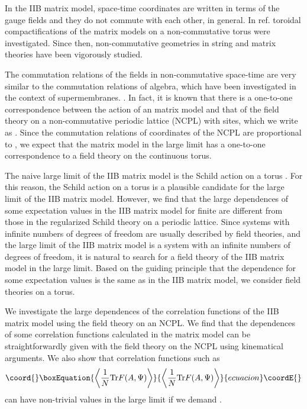 \documentclass[12pt,a4paper]{article}
\providecommand{\ncpl}{{\mathbb T}^2_\frac{2}{N}}
\providecommand{\Tr}{\mbox{\rm Tr}}
\begin{document}
In the IIB matrix model, space-time coordinates are written in terms
of the gauge fields and they do not commute with each other, in
general.
In ref.\cite{CDS} toroidal compactifications of the matrix models on
a non-commutative torus were investigated. Since then,
non-commutative geometries in string and matrix theories have been
vigorously studied.

The commutation relations of the fields in non-commutative space-time
are very similar to the commutation relations of \coordHE{} algebra, which
have been investigated in the context of supermembranes.
\cite{deWit,poppe,zachos,castro}.
In fact, it is known that there is a one-to-one correspondence between
the action of an \coordHE{} matrix model and that of the field theory
on a non-commutative periodic lattice (NCPL) with \coordHE{} sites,
which we write as \myHighlight{$\ncpl$}\coordHE{} \cite{bars,tokyou,landi}.
Since the commutation relations of coordinates of the NCPL are
proportional to \coordHE{}, we expect that the matrix model in
the large \coordHE{} limit has a one-to-one correspondence to a field theory
on the continuous torus.

The naive large \coordHE{} limit of the IIB matrix model is the Schild action
on a torus \cite{Schild}. For this reason, the Schild action on a torus
is a plausible candidate for the large \coordHE{} limit of the IIB matrix
model.
However, we find that the large \coordHE{} dependences of some expectation
values in the IIB matrix model for finite \coordHE{} are different from those
in the regularized Schild theory on a periodic \coordHE{} lattice.
Since systems with infinite numbers of degrees of freedom are usually
described by field theories, and the large \coordHE{} limit of the IIB matrix
model is a system with an infinite numbers of degrees of freedom, it
is natural to search for a field theory of the IIB matrix model in the
large \coordHE{} limit.
Based on the guiding principle that the \coordHE{} dependence for some
expectation values is the same as in the IIB matrix model, we consider
field theories on a torus.

We investigate the large \coordHE{} dependences of the correlation functions
of the IIB matrix model using the field theory on an NCPL.
We find that the \coordHE{} dependences of some correlation functions
calculated in the matrix model can be straightforwardly given with the
field theory on the NCPL using kinematical arguments.
We also show that correlation functions such as
\begin{equation}\coord{}\boxEquation{
	\left\langle\frac{1}{N}\Tr F(A,\Psi)\right\rangle
}{
	\left\langle\frac{1}{N}\Tr F(A,\Psi)\right\rangle
}{ecuacion}\coordE{}\end{equation}
can have non-trivial values in the large \coordHE{} limit if we demand
\coordHE{}.
\end{document}
